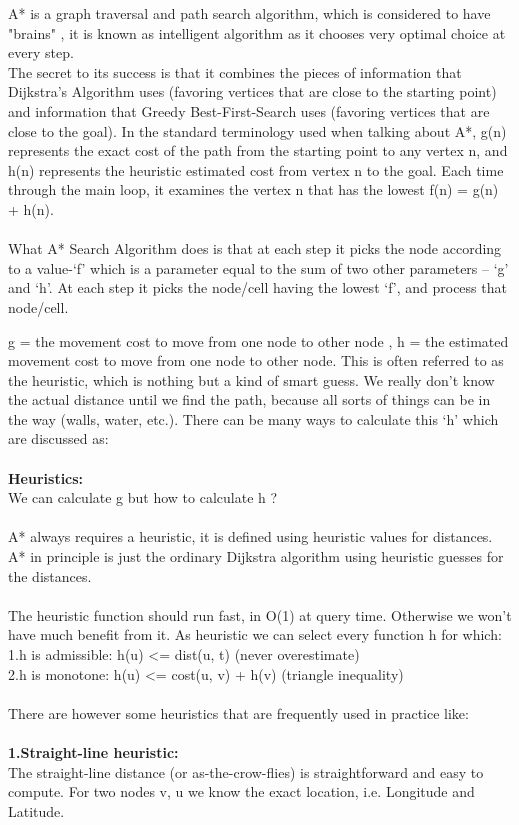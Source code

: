 \documentclass[14pt,a4]{extreport}
\begin{document}
A* is a graph traversal and path search algorithm, which is considered to have "brains" , it is known as intelligent algorithm as it chooses very optimal choice at every step.\\
The secret to its success is that it combines the pieces of information that Dijkstra’s Algorithm uses (favoring vertices that are close to the starting point) and information that Greedy Best-First-Search uses (favoring vertices that are close to the goal). In the standard terminology used when talking about A*, g(n) represents the exact cost of the path from the starting point to any vertex n, and h(n) represents the heuristic estimated cost from vertex n to the goal. Each time through the main loop, it examines the vertex n that has the lowest f(n) = g(n) + h(n).\\\\
What A* Search Algorithm does is that at each step it picks the node according to a value-‘f’ which is a parameter equal to the sum of two other parameters – ‘g’ and ‘h’. At each step it picks the node/cell having the lowest ‘f’, and process that node/cell.


g = the movement cost to move from one node to other node ,
h = the estimated movement cost to move from one node to other node. This is often referred to as the heuristic, which is nothing but a kind of smart guess. We really don’t know the actual distance until we find the path, because all sorts of things can be in the way (walls, water, etc.). There can be many ways to calculate this ‘h’ which are discussed as: 
\\\\
\textbf{Heuristics:}\\
We can calculate g but how to calculate h ?\\
\\
A* always requires a heuristic, it is defined using heuristic values for distances. A* in principle is just the ordinary Dijkstra algorithm using heuristic guesses for the distances.\\
\\
The heuristic function should run fast, in O(1) at query time. Otherwise we won't have much benefit from it. As heuristic we can select every function h for which:\\

1.h is admissible: h(u) \textless= dist(u, t) (never overestimate)\\
2.h is monotone: h(u) \textless= cost(u, v) + h(v) (triangle inequality)\\\\
There are however some heuristics that are frequently used in practice like:\\\\
\textbf{1.Straight-line heuristic:}\\
The straight-line distance (or as-the-crow-flies) is straightforward and easy to compute. For two nodes v, u we know the exact location, i.e. Longitude and Latitude.
\end{document}
